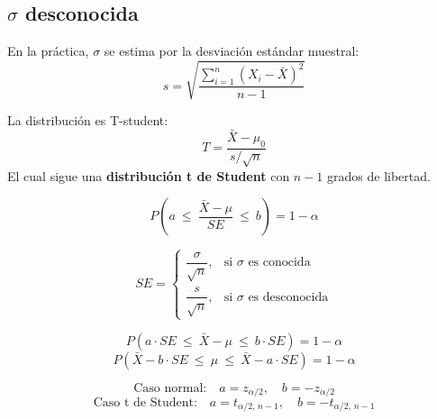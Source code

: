 \documentclass[12pt]{article}
\begin{document}
\subsection{$\sigma$ desconocida}
En la práctica, $\sigma$ se estima por la desviación estándar muestral:
\[
s = \sqrt{\frac{\sum_{i=1}^n (X_i - \bar{X})^2}{n-1}}
\]

La distribución es T-student:
\[
T = \frac{\bar{X} - \mu_0}{s / \sqrt{n}}
\]
El cual sigue una \textbf{distribución t de Student} con $n-1$ grados de libertad.

\vspace{4cm}

\[ P\left( a \ \le \ \frac{\bar{X} - \mu}{SE} \ \le \ b \right) = 1 - \alpha\]

\[
SE =
\begin{cases}
\dfrac{\sigma}{\sqrt{n}}, & \text{si } \sigma \text{ es conocida} \\
\dfrac{s}{\sqrt{n}}, & \text{si } \sigma \text{ es desconocida}
\end{cases}
\]

\[
P\left( a \cdot SE \ \le \ \bar{X} - \mu \ \le \ b \cdot SE \right) = 1 - \alpha
\]
\[
P\left( \bar{X} - b \cdot SE \ \le \ \mu \ \le \ \bar{X} - a \cdot SE \right) = 1 - \alpha
\]

\[
\text{Caso normal:} \quad a = z_{\alpha/2}, \quad b = -z_{\alpha/2}
\]
\[
\text{Caso t de Student:} \quad a = t_{\alpha/2,\,n-1}, \quad b =-t_{\alpha/2,\,n-1}
\]
\end{document}
